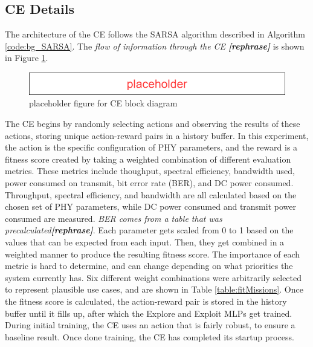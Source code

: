 \subsection{CE Details}
\par The architecture of the CE follows the SARSA algorithm described in Algorithm \ref{code:bg_SARSA}. The \textit{flow of information through the CE \textbf{[rephrase]}} is shown in Figure \ref{fig:ceDataFlow}. 
\begin{figure}[ht]
\includegraphics[width=\textwidth]{figures/Placeholder.png}
\caption{placeholder figure for CE block diagram}\label{fig:ceDataFlow}
\end{figure}
\par The CE begins by randomly selecting actions and observing the results of these actions, storing unique action-reward pairs in a history buffer. In this experiment, the action is the specific configuration of PHY parameters, and the reward is a fitness score created by taking a weighted combination of different evaluation metrics. These metrics include thoughput, spectral efficiency, bandwidth used, power consumed on transmit, bit error rate (BER), and DC power consumed. Throughput, spectral efficiency, and bandwidth are all calculated based on the chosen set of PHY parameters, while DC power consumed and transmit power consumed are measured. \textit{BER comes from a table that was precalculated\textbf{[rephrase]}}. Each parameter gets scaled from 0 to 1 based on the values that can be expected from each input. Then, they get combined in a weighted manner to produce the resulting fitness score. The importance of each metric is hard to determine, and can change depending on what priorities the system currently has. Six different weight combinations were arbitrarily selected to represent plausible use cases, and are shown in Table \ref{table:fitMissions}. Once the fitness score is calculated, the action-reward pair is stored in the history buffer until it fills up, after which the Explore and Exploit MLPs get trained. During initial training, the CE uses an action that is fairly robust, to ensure a baseline result. Once done training, the CE has completed its startup process.
